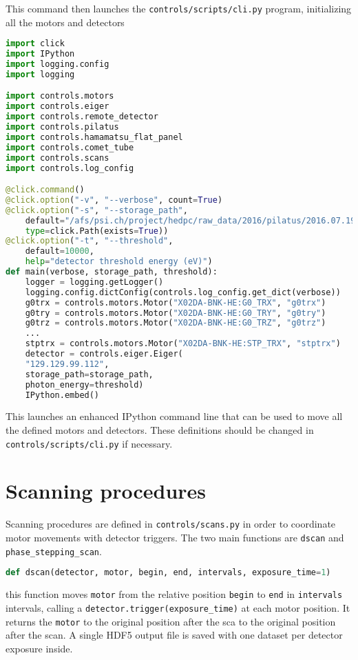 This command then launches the \texttt{controls/scripts/cli.py} program,
initializing all the motors and detectors

\begin{lstlisting}[language=Python]
import click
import IPython
import logging.config
import logging

import controls.motors
import controls.eiger
import controls.remote_detector
import controls.pilatus
import controls.hamamatsu_flat_panel
import controls.comet_tube
import controls.scans
import controls.log_config

@click.command()
@click.option("-v", "--verbose", count=True)
@click.option("-s", "--storage_path",
    default="/afs/psi.ch/project/hedpc/raw_data/2016/pilatus/2016.07.19",
    type=click.Path(exists=True))
@click.option("-t", "--threshold",
    default=10000,
    help="detector threshold energy (eV)")
def main(verbose, storage_path, threshold):
    logger = logging.getLogger()
    logging.config.dictConfig(controls.log_config.get_dict(verbose))
    g0trx = controls.motors.Motor("X02DA-BNK-HE:G0_TRX", "g0trx")
    g0try = controls.motors.Motor("X02DA-BNK-HE:G0_TRY", "g0try")
    g0trz = controls.motors.Motor("X02DA-BNK-HE:G0_TRZ", "g0trz")
    ...
    stptrx = controls.motors.Motor("X02DA-BNK-HE:STP_TRX", "stptrx")
    detector = controls.eiger.Eiger(
    "129.129.99.112",
    storage_path=storage_path,
    photon_energy=threshold)
    IPython.embed()
\end{lstlisting}

This launches an enhanced IPython command line that can be used to move all
the defined motors and detectors. These definitions should be changed in
\texttt{controls/scripts/cli.py} if necessary.

\section{Scanning procedures}
Scanning procedures are defined in \texttt{controls/scans.py} in order to
coordinate motor movements with detector triggers. The two main functions are
\texttt{dscan} and
\texttt{phase\_stepping\_scan}.

\begin{lstlisting}[language=Python]
def dscan(detector, motor, begin, end, intervals, exposure_time=1)
\end{lstlisting}
this function moves \texttt{motor} from the relative position \texttt{begin}
to \texttt{end} in \texttt{intervals} intervals, calling a
\texttt{detector.trigger(exposure\_time)} at each motor position. It returns
the \texttt{motor} to the original position after the sca to the original
position after the scan.
A single HDF5 output file is saved with one dataset per detector exposure
inside.


